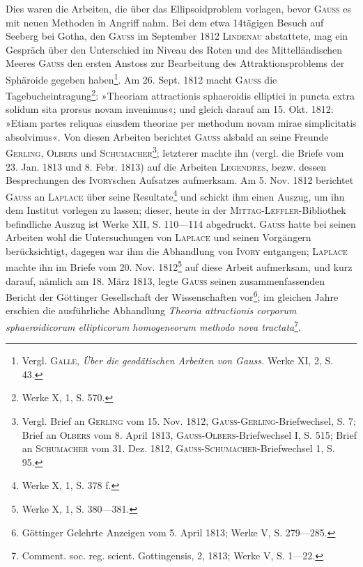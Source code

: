 \clearpage\begingroup{}
\makeatletter\tagsleft@true\let\veqno\@@leqno\makeatother
\renewcommand{\thefootnote}{\arabic{footnote})}\setcounter{footnote}{64}
\begin{center}\end{center}
\noindent\hspace*{\parindent}Dies waren die Arbeiten, die über das Ellipsoidproblem vorlagen, bevor
\textsc{Gauss} es mit neuen Methoden in Angriff nahm. Bei dem etwa 14tägigen
Besuch auf Seeberg bei Gotha, den \textsc{Gauss} im September 1812 \textsc{Lindenau} abstattete,
mag ein Gespräch über den Unterschied im Niveau des Roten und
des Mittelländischen Meeres \textsc{Gauss} den ersten Anstoss zur Bearbeitung des
Attraktionsproblems der Sphäroide gegeben haben\footnote{Vergl. \textsc{Galle}, \textit{Über die geodätischen Arbeiten von Gauss.} Werke XI, 2, S. 43.}. Am 26. Sept. 1812
macht \textsc{Gauss} die Tagebucheintragung\footnote{Werke X, 1, S. 570.}: »Theoriam attractionis sphaeroidis
elliptici in puncta extra solidum sita prorsus novam invenimus«; und gleich
darauf am 15. Okt. 1812: »Etiam partes reliquas eiusdem theoriae per methodum
novam mirae simplicitatis absolvimus«. Von diesen Arbeiten berichtet
\textsc{Gauss} alsbald an seine Freunde \textsc{Gerling}, \textsc{Olbers} und \textsc{Schumacher}\footnote{Vergl. Brief an \textsc{Gerling} vom 15. Nov. 1812, \textsc{Gauss-Gerling}-Briefwechsel, S. 7; Brief an \textsc{Olbers}
vom 8. April 1813, \textsc{Gauss-Olbers}-Briefwechsel I, S. 515; Brief an \textsc{Schumacher} vom 31. Dez. 1812, \textsc{Gauss-Schumacher}-Briefwechsel 1, S. 95.}; letzterer
machte ihn (vergl. die Briefe vom 23. Jan. 1813 und 8. Febr. 1813) auf die
Arbeiten \textsc{Legendres}, bezw. dessen Besprechungen des \textsc{Ivory}schen Aufsatzes aufmerksam.
Am 5. Nov. 1812 berichtet \textsc{Gauss} an \textsc{Laplace} über seine Resultate\footnote{Werke X, 1, S. 378 f.}
und schickt ihm einen Auszug, um ihn dem Institut vorlegen zu lassen;
dieser, heute in der \textsc{Mittag-Leffler}-Bibliothek befindliche Auszug ist Werke
XII, S. 110—114 abgedruckt. \textsc{Gauss} hatte bei seinen Arbeiten wohl die
Untersuchungen von \textsc{Laplace} und seinen Vorgängern berücksichtigt, dagegen
war ihm die Abhandlung von \textsc{Ivory} entgangen; \textsc{Laplace} machte ihn im Briefe
vom 20. Nov. 1812\footnote{Werke X, 1, S. 380—381.} auf diese Arbeit aufmerksam, und kurz darauf, nämlich
\clearpage{}
\noindent am 18. März 1813, legte \textsc{Gauss} seinen zusammenfassenden Bericht der Göttinger
Gesellschaft der Wissenschaften vor\footnote{Göttinger Gelehrte Anzeigen vom 5. April 1813; Werke V, S. 279—285.}; im gleichen Jahre erschien die ausführliche
Abhandlung \textit{Theoria attractionis corporum sphaeroidicorum ellipticorum
homogeneorum methodo nova tractata}\footnote{Comment. soc. reg. scient. Gottingensis, 2, 1813; Werke V, S. 1—22.}.

